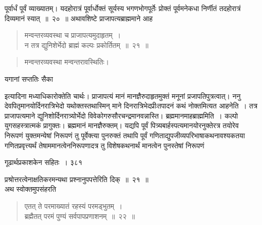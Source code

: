 \documentclass[11pt, openany]{book}
\begin{document}
 पूर्वार्धं पूर्वं व्याख्यातम्। यदहोरात्रं पूर्वार्धोक्तं सूर्यस्य भगणभोगपूर्तेः प्रोक्तं पूर्वमनेकधा निर्णीतं तदहोरात्रं दिव्यमानं स्यात्~॥~२०~॥
\noindent  अथावशिष्टे प्राजापत्यब्राह्ममाने आह \textendash

\begin{quote}
{\ssi मन्वन्तरव्यवस्था च प्राजापत्यमुदाहृतम्~।\\
न तत्र द्युनिशेर्भेदो ब्राह्मं कल्पः प्रकोर्तितम्~॥~२१~॥ }
\end{quote}

\begin{quote}
 {\qt मन्वन्तरव्यवस्था मन्वन्तरावस्थितिः। }
 \end{quote}

\begin{center}
{\qt यगानां सप्ततिः सैका }
\end{center}
इत्यादिना मध्याधिकारोक्तेति चार्थः। प्राजापत्यं मानं मानज्ञैरुदाहृतमुक्तं मनूनां प्रजापतिपुत्रत्वात्। ननु देवपितृमानयोर्दिनरात्रिभेदो यथोक्तस्तथास्मिन् माने दिनरात्रिभेदप्रीःतपादनं कथं नोक्तमित्यत आह\textendash नेति~। तत्र प्राजापत्यमाने द्युनिशोर्दिनरात्र्योर्भेदो विवेकोगरुसौरचन्द्रमानवन्नास्ति। ब्रह्ममानमाह\textendash ब्राह्ममिति~। कल्पो युगसहस्त्रात्मकं प्रागुक्तः। ब्रह्ममानं मानज्ञैरुक्तम्। यद्यपि पूर्वं पित्र्यबार्हस्पत्यमानयोरनुक्तेरत्र तयोरेव निरूपणं युक्तमन्येषां निरूपणं तु पूर्वेक्त्या पुनरुक्तं तथापि पूर्वं गणिताद्युपजीव्यपरिभाषाकथनावश्यकतया गणितप्रवृत्त्यर्थं तेषाममानत्वेननिरूपणादत्र तु विशेषकथनार्थं मानत्वेन पुनस्तेषां निरूपणं



\newpage


\hspace{3cm} गूढार्थप्रकाशकेन सहितः~। \hfill ३८१ 
\vspace{1cm}


\noindent प्रश्रोत्तरत्वेनाक्षतिकरमन्यथा प्रश्नानुपपत्तेरिति दिक्~॥~२१~॥\\
\noindent अथ स्वोक्तमुपसंहरति\textendash 


\begin{quote}
 {\ssi एतत् ते परमाख्यातं रहस्यं परमड्भुतम्~।\\
ब्रह्मैतत् परमं पुण्यं सर्वपापप्रणाशनम्~॥~२२~॥ }
\end{quote}
\end{document}
